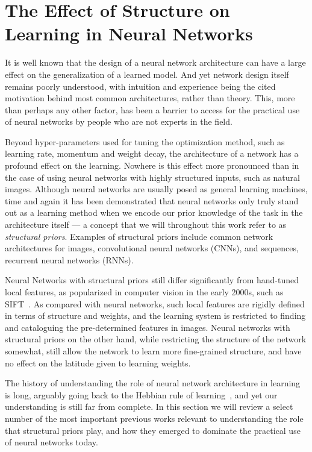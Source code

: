 \documentclass[thesis]{subfiles}
\begin{document}
	\chapter{The Effect of Structure on Learning in Neural Networks}\label{motivation}
	
	It is well known that the design of a neural network architecture can have a large effect on the generalization of a learned model. And yet network design itself remains poorly understood, with intuition and experience being the cited motivation behind most common architectures, rather than theory. This, more than perhaps any other factor, has been a barrier to access for the practical use of neural networks by people who are not experts in the field.
	
	Beyond hyper-parameters used for tuning the optimization method, such as learning rate, momentum and weight decay, the architecture of a network has a profound effect on the learning. Nowhere is this effect more pronounced than in the case of using neural networks with highly structured inputs, such as natural images. Although neural networks are usually posed as general learning machines, time and again it has been demonstrated that neural networks only truly stand out as a learning method when we encode our prior knowledge of the task in the architecture itself --- a concept that we will throughout this work refer to as \emph{structural priors}. Examples of structural priors include common network architectures for images, convolutional neural networks (CNNs), and sequences, recurrent neural networks (RNNs).
	
	Neural Networks with structural priors still differ significantly from hand-tuned local features, as popularized in computer vision in the early 2000s, such as SIFT~\citep{Lowe2004}. As compared with neural networks, such local features are rigidly defined in terms of structure and weights, and the learning system is restricted to finding and cataloguing the pre-determined features in images. Neural networks with structural priors on the other hand, while restricting the structure of the network somewhat, still allow the network to learn more fine-grained structure, and have no effect on the latitude given to learning weights.
	
	
	The history of understanding the role of neural network architecture in learning is long, arguably going back to the Hebbian rule of learning~\citep{hebb1949organization}, and yet our understanding is still far from complete. In this section we will review a select number of the most important previous works relevant to understanding the role that structural priors play, and how they emerged to dominate the practical use of neural networks today.
	
\end{document}
